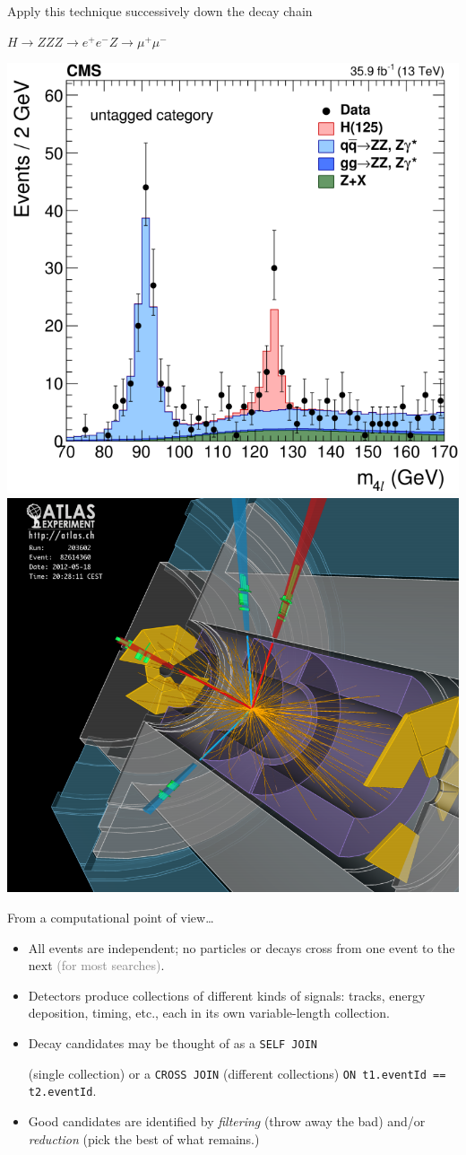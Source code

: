 \documentclass[aspectratio=169]{beamer}
\begin{document}
\begin{frame}{Apply this technique successively down the decay chain}
\Large
\begin{center}
$H \to ZZ$\hspace{1 cm}$Z \to e^+e^-$\hspace{1 cm}$Z \to \mu^+\mu^-$
\end{center}

\includegraphics[height=6 cm]{higgs-to-four-leptons.png}\hfill\includegraphics[height=6 cm]{higgs-to-four-leptons-2.png}
\end{frame}

\begin{frame}{From a computational point of view\ldots}
\Large
\vspace{0.15 cm}
\begin{itemize}\setlength{\itemsep}{0.25 cm}
\item All events are independent; no particles or decays cross from one event to the next \textcolor{gray}{(for most searches)}.
\item Detectors produce collections of different kinds of signals: tracks, energy deposition, timing, etc., each in its own variable-length collection.
\item Decay candidates may be thought of as a \texttt{SELF JOIN}

(single collection) or a \texttt{CROSS JOIN} (different collections) \texttt{ON t1.eventId == t2.eventId}.
\item Good candidates are identified by {\it filtering} (throw away the bad) and/or {\it reduction} (pick the best of what remains.)
\end{itemize}
\end{frame}
\end{document}
